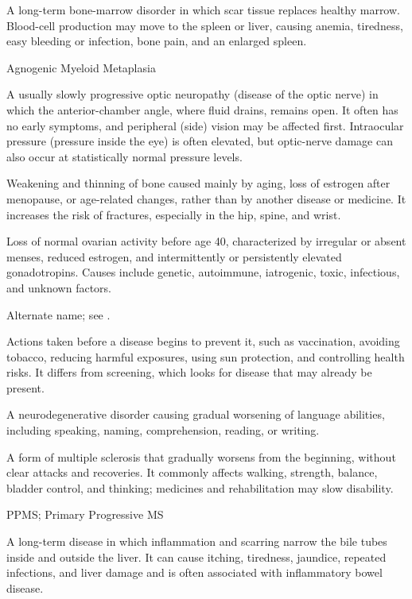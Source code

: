  A long-term bone-marrow disorder in which scar tissue replaces healthy marrow. Blood-cell production may move to the spleen or liver, causing anemia, tiredness, easy bleeding or infection, bone pain, and an enlarged spleen.

\synonyms
Agnogenic Myeloid Metaplasia

 A usually slowly progressive optic neuropathy (disease of the optic nerve) in which the anterior-chamber angle, where fluid drains, remains open. It often has no early symptoms, and peripheral (side) vision may be affected first. Intraocular pressure (pressure inside the eye) is often elevated, but optic-nerve damage can also occur at statistically normal pressure levels.

 Weakening and thinning of bone caused mainly by aging, loss of estrogen after menopause, or age-related changes, rather than by another disease or medicine. It increases the risk of fractures, especially in the hip, spine, and wrist.

 Loss of normal ovarian activity before age 40, characterized by irregular or absent
menses, reduced estrogen, and intermittently or persistently elevated gonadotropins.
Causes include genetic, autoimmune, iatrogenic, toxic, infectious, and unknown factors.

 Alternate name; see .

 Actions taken before a disease begins to prevent it, such as vaccination, avoiding tobacco, reducing harmful exposures, using sun protection, and controlling health risks. It differs from screening, which looks for disease that may already be present.

 A neurodegenerative disorder causing gradual worsening of language abilities, including speaking, naming, comprehension, reading, or writing.

 A form of multiple sclerosis that gradually worsens from the beginning, without clear attacks and recoveries. It commonly affects walking, strength, balance, bladder control, and thinking; medicines and rehabilitation may slow disability.

\synonyms
PPMS; Primary Progressive MS

 A long-term disease in which inflammation and scarring narrow the bile tubes inside and outside the liver. It can cause itching, tiredness, jaundice, repeated infections, and liver damage and is often associated with inflammatory bowel disease.

